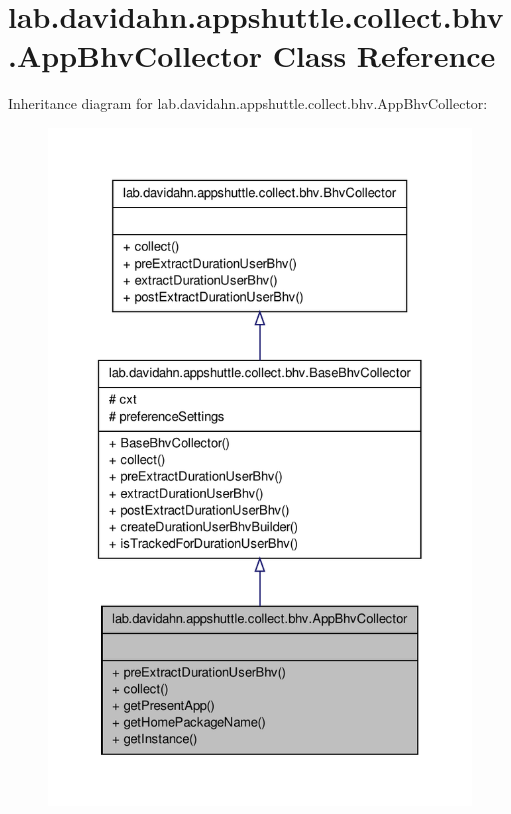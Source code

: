 \hypertarget{classlab_1_1davidahn_1_1appshuttle_1_1collect_1_1bhv_1_1_app_bhv_collector}{\section{lab.\-davidahn.\-appshuttle.\-collect.\-bhv.\-App\-Bhv\-Collector \-Class \-Reference}
\label{classlab_1_1davidahn_1_1appshuttle_1_1collect_1_1bhv_1_1_app_bhv_collector}
}


\-Inheritance diagram for lab.\-davidahn.\-appshuttle.\-collect.\-bhv.\-App\-Bhv\-Collector\-:
\nopagebreak
\begin{figure}[H]
\begin{center}
\leavevmode
\includegraphics[width=330pt]{classlab_1_1davidahn_1_1appshuttle_1_1collect_1_1bhv_1_1_app_bhv_collector__inherit__graph}
\end{center}
\end{figure}


